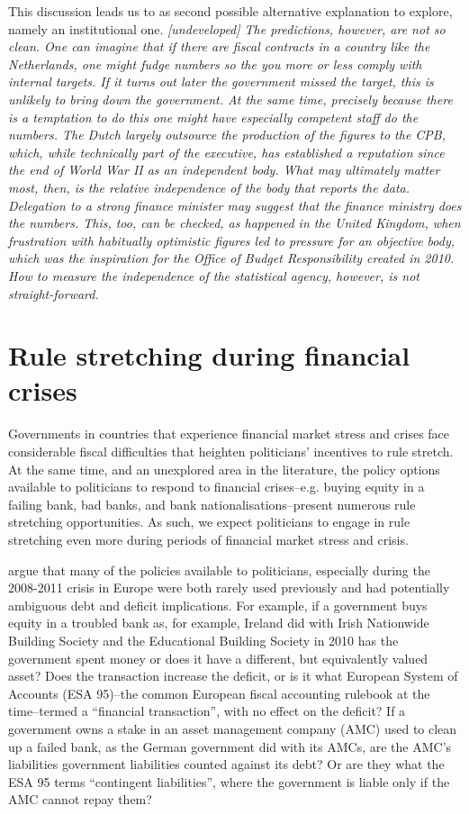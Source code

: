 \documentclass[]{article}
\begin{document}
This discussion leads us to as second possible alternative explanation to explore, namely an  institutional one. \emph{[undeveloped]  The predictions, however, are not so clean. One can imagine that if there are fiscal contracts in a country like the Netherlands, one might fudge numbers so the you more or less comply with internal targets. If it turns out later the government missed the target, this is unlikely to bring down the government. At the same time, precisely because  there is a temptation to do this one might have especially competent staff do the numbers. The Dutch largely outsource the production of the figures to the CPB, which, while technically part of the executive, has established a reputation since the end of World War II as an independent body. What may ultimately matter most, then, is the relative independence of the body that reports the data. Delegation to a strong finance minister may suggest that the finance ministry does the numbers. This, too, can be checked, as happened in the United Kingdom, when frustration with habitually optimistic figures led to pressure for an objective body, which was the inspiration for the Office of Budget Responsibility created in 2010. How to measure the independence of the statistical agency, however, is not straight-forward.}

\section{Rule stretching during financial crises}

Governments in countries that experience financial market stress and crises face considerable fiscal difficulties \cite[see][]{Laeven2012} that heighten politicians' incentives to rule stretch. At the same time, and an unexplored area in the literature, the policy options available to politicians to respond to financial crises--e.g. buying equity in a failing bank, bad banks, and bank nationalisations--present numerous rule stretching opportunities. As such, we expect politicians to engage in rule stretching even more during periods of financial market stress and crisis.

\cite{GandrudHallerberg2016} argue that many of the policies available to politicians, especially during the 2008-2011 crisis in Europe were both rarely used previously and had potentially ambiguous debt and deficit implications. For example, if a government buys equity in a troubled bank as, for example, Ireland did with Irish Nationwide Building Society and the Educational Building Society in 2010 has the government spent money or does it have a different, but equivalently valued asset? Does the transaction increase the deficit, or is it what European System of Accounts (ESA 95)--the common European fiscal accounting rulebook at the time--termed a ``financial transaction'', with no effect on the deficit? If a government owns a stake in an asset management company (AMC) used to clean up a failed bank, as the German government did with its AMCs, are the AMC's liabilities government liabilities counted against its debt? Or are they what the ESA 95 terms ``contingent liabilities'', where the government is liable only if the AMC cannot repay them?
\end{document}
